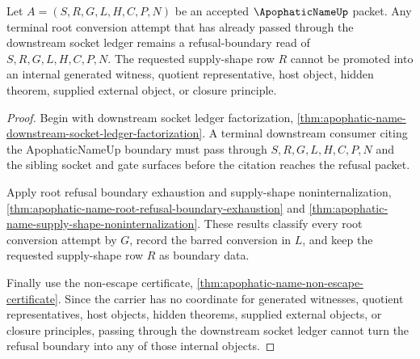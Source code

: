 \begin{theorem}
\label{thm:apophatic-name-root-refusal-terminal-nonpromotion}
Let $A=(S,R,G,L,H,C,P,N)$ be an accepted $\ApophaticNameUp$ packet. Any terminal root conversion attempt that has already passed through the downstream socket ledger remains a refusal-boundary read of $S,R,G,L,H,C,P,N$. The requested supply-shape row $R$ cannot be promoted into an internal generated witness, quotient representative, host object, hidden theorem, supplied external object, or closure principle.
\end{theorem}
\begin{proof}
Begin with downstream socket ledger factorization, \autoref{thm:apophatic-name-downstream-socket-ledger-factorization}. A terminal downstream consumer citing the ApophaticNameUp boundary must pass through $S,R,G,L,H,C,P,N$ and the sibling socket and gate surfaces before the citation reaches the refusal packet.

Apply root refusal boundary exhaustion and supply-shape noninternalization, \autoref{thm:apophatic-name-root-refusal-boundary-exhaustion} and \autoref{thm:apophatic-name-supply-shape-noninternalization}. These results classify every root conversion attempt by $G$, record the barred conversion in $L$, and keep the requested supply-shape row $R$ as boundary data.

Finally use the non-escape certificate, \autoref{thm:apophatic-name-non-escape-certificate}. Since the carrier has no coordinate for generated witnesses, quotient representatives, host objects, hidden theorems, supplied external objects, or closure principles, passing through the downstream socket ledger cannot turn the refusal boundary into any of those internal objects.
\end{proof}

